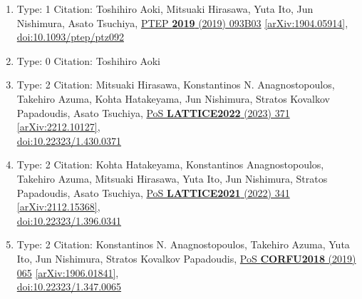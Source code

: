 \documentclass[a4paper,10pt]{article}
\begin{document}
\begin{enumerate}
\begin{enumerate}
  \item Type: 1 Citation: Toshihiro Aoki, Mitsuaki Hirasawa, Yuta Ito, Jun Nishimura, Asato Tsuchiya, \href{https://www.doi.org/10.1093/ptep/ptz092}{PTEP {\bf 2019} (2019) 093B03}  \href{https://arxiv.org/abs/1904.05914}{[arXiv:1904.05914]},\\\href{https://www.doi.org/10.1093/ptep/ptz092}{doi:10.1093/ptep/ptz092}
  \item Type: 0 Citation: Toshihiro Aoki
  \item Type: 2 Citation: Mitsuaki Hirasawa, Konstantinos N. Anagnostopoulos, Takehiro Azuma, Kohta Hatakeyama, Jun Nishimura, Stratos Kovalkov Papadoudis, Asato Tsuchiya, \href{https://www.doi.org/10.22323/1.430.0371}{PoS {\bf LATTICE2022} (2023) 371}  \href{https://arxiv.org/abs/2212.10127}{[arXiv:2212.10127]},\\\href{https://www.doi.org/10.22323/1.430.0371}{doi:10.22323/1.430.0371}
  \item Type: 2 Citation: Kohta Hatakeyama, Konstantinos Anagnostopoulos, Takehiro Azuma, Mitsuaki Hirasawa, Yuta Ito, Jun Nishimura, Stratos Papadoudis, Asato Tsuchiya, \href{https://www.doi.org/10.22323/1.396.0341}{PoS {\bf LATTICE2021} (2022) 341}  \href{https://arxiv.org/abs/2112.15368}{[arXiv:2112.15368]},\\\href{https://www.doi.org/10.22323/1.396.0341}{doi:10.22323/1.396.0341}
  \item Type: 2 Citation: Konstantinos N. Anagnostopoulos, Takehiro Azuma, Yuta Ito, Jun Nishimura, Stratos Kovalkov Papadoudis, \href{https://www.doi.org/10.22323/1.347.0065}{PoS {\bf CORFU2018} (2019) 065}  \href{https://arxiv.org/abs/1906.01841}{[arXiv:1906.01841]},\\\href{https://www.doi.org/10.22323/1.347.0065}{doi:10.22323/1.347.0065}

\end{enumerate}
\end{enumerate}
\end{document}
